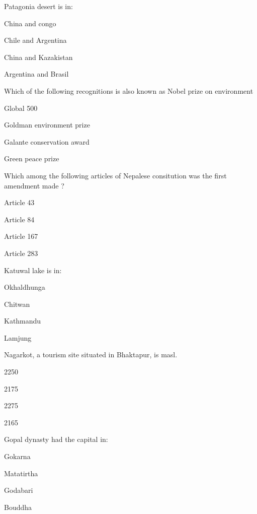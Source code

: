 \begin{questions}
\question Patagonia desert is in:
  \begin{items}
  \item China and congo
  \item Chile and Argentina
  \item* China and Kazakistan
  \item Argentina and Brasil
  \end{items}

\question Which of the following recognitions is also known as Nobel prize on environment
  \begin{items}
  \item Global 500
  \item* Goldman environment prize
  \item Galante conservation award
  \item Green peace prize
  \end{items}

\question Which among the following articles of Nepalese consitution was the first amendment made ?
  \begin{items}
  \item Article 43
  \item Article 84
  \item Article 167
  \item Article 283
  \end{items}

\question Katuwal lake is in:
  \begin{items}
  \item Okhaldhunga
  \item Chitwan
  \item* Kathmandu
  \item Lamjung
  \end{items}

\question Nagarkot, a tourism site situated in Bhaktapur, is \fillin[][2cm] masl.
  \begin{items}
  \item 2250
  \item* 2175
  \item 2275
  \item 2165
  \end{items}

\question Gopal dynasty had the capital in:
  \begin{items}
  \item* Gokarna
  \item Matatirtha
  \item Godabari
  \item Bouddha
  \end{items}


\end{questions}
